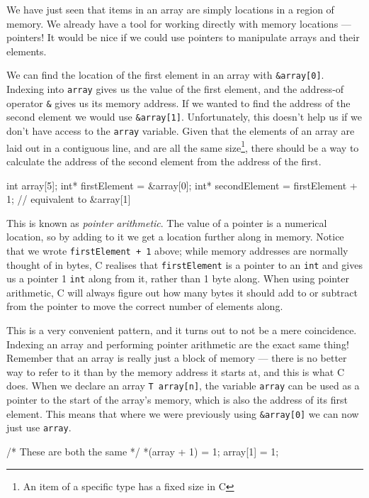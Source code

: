 We have just seen that items in an array are simply locations in a region of memory.
We already have a tool for working directly with memory locations --- pointers!
It would be nice if we could use pointers to manipulate arrays and their elements.

We can find the location of the first element in an array with \lstinline!&array[0]!.
Indexing into \lstinline!array! gives us the value of the first element, and the address-of operator \lstinline!&! gives us its memory address.
If we wanted to find the address of the second element we would use \lstinline!&array[1]!.
Unfortunately, this doesn't help us if we don't have access to the \lstinline!array! variable.
Given that the elements of an array are laid out in a contiguous line, and are all the same size\footnote{An item of a specific type has a fixed size in C}, there should be a way to calculate the address of the second element from the address of the first.

\begin{codeblock}
int array[5];
int* firstElement = &array[0];
int* secondElement = firstElement + 1; // equivalent to &array[1]
\end{codeblock}

This is known as \emph{pointer arithmetic}.
The value of a pointer is a numerical location, so by adding to it we get a location further along in memory.
Notice that we wrote \lstinline!firstElement + 1! above; while memory addresses are normally thought of in bytes, C realises that \lstinline{firstElement} is a pointer to an \lstinline!int! and gives us a pointer 1 \lstinline!int! along from it, rather than 1 byte along.
When using pointer arithmetic, C will always figure out how many bytes it should add to or subtract from the pointer to move the correct number of elements along.

This is a very convenient pattern, and it turns out to not be a mere coincidence.
Indexing an array and performing pointer arithmetic are the exact same thing!
Remember that an array is really just a block of memory --- there is no better way to refer to it than by the memory address it starts at, and this is what C does.
When we declare an array \lstinline!T array[n]!, the variable \lstinline!array! can be used as a pointer to the start of the array's memory, which is also the address of its first element.
This means that where we were previously using \lstinline!&array[0]! we can now just use \lstinline!array!.

\begin{codeblock}
/* These are both the same */
*(array + 1) = 1;
array[1] = 1; 
\end{codeblock}


